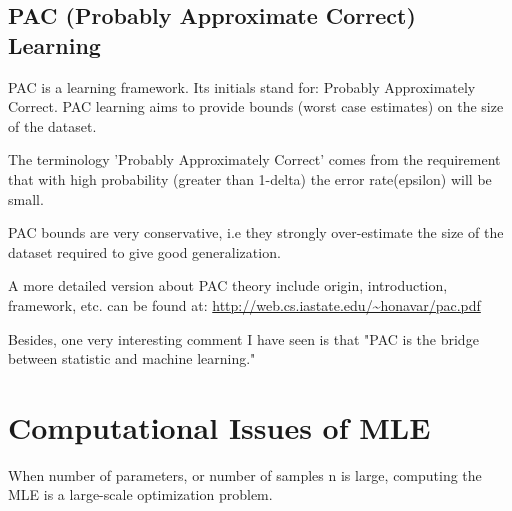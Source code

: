 \documentclass[letterpaper,10pt]{article}
\begin{document}
\subsection{PAC (Probably Approximate Correct) Learning}

PAC is a learning framework. Its initials stand for: Probably Approximately Correct. PAC learning aims to provide bounds (worst case estimates) on the size of the dataset.

The terminology 'Probably Approximately Correct' comes from the requirement that with high probability (greater than 1-delta) the error rate(epsilon) will be small. 

PAC bounds are very conservative, i.e they strongly over-estimate the size of the dataset required to give good generalization.

A more detailed version about PAC theory include origin, introduction, framework, etc. can be found at:
\url{http://web.cs.iastate.edu/~honavar/pac.pdf}

Besides, one very interesting comment I have seen is that
"PAC is the bridge between statistic and machine learning."

\section{Computational Issues of MLE}

When number of parameters, or number of samples n is large, computing the MLE is a large-scale optimization problem.
\end{document}
